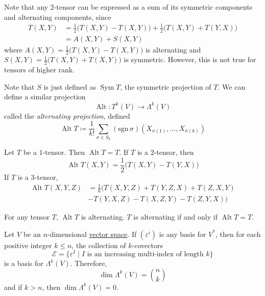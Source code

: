 \documentclass{article}
\DeclareMathOperator{\Sym}{Sym}
\DeclareMathOperator{\Alt}{Alt}
\newcounter{theorem}[section]
\newcounter{example}[section]
\begin{document}
    Note that any $2$-tensor can be expressed as a sum of its symmetric components and alternating components, since
    \begin{align*}
        T(X, Y) & = \frac{1}{2} \big( T(X, Y) - T(X, Y)\big) + \frac{1}{2} \big( T(X, Y) + T(Y, X) \big) \\
        & = A(X, Y) + S(X, Y)
    \end{align*}
    where $A(X, Y) = \frac{1}{2} \big( T(X, Y) - T(X, Y) \big)$ is alternating and $S (X, Y) = \frac{1}{2} \big( T(X, Y) + T(X, Y) \big)$ is symmetric. However, this is not true for tensors of higher rank. 

    Note that $S$ is just defined as $\Sym{T}$, the symmetric projection of $T$. We can define a similar projection 
    \begin{equation}
      \Alt: T^k (V) \to \Lambda^k (V)
    \end{equation}
    called the \textit{alternating projection}, defined
    \begin{equation}
      \Alt{T} \coloneqq \frac{1}{k!} \sum_{\sigma \in S_k} (\text{sgn}\,\sigma) (X_{\sigma(1)}, ..., X_{\sigma(k)})
    \end{equation}

    \begin{example}
      \label{ex:alternation-of-1-and-2-tensors}
    Let $T$ be a $1$-tensor. Then $\Alt{T} = T$. If $T$ is a $2$-tensor, then
    \begin{equation}
      \Alt{T(X, Y)} = \frac{1}{2} \big(T(X, Y) - T(Y, X) \big)
    \end{equation}
    If $T$ is a $3$-tensor, 
    \begin{align*}
        \Alt{T(X, Y, Z)} & = \frac{1}{6} \big( T(X, Y, Z) + T(Y, Z, X) + T(Z, X, Y) \\ & - T(Y, X, Z) - T(X, Z, Y) - T(Z, Y, X) \big)  
    \end{align*}
    \end{example}

    \begin{lemma}
      \label{thm:properties-of-the-alternating-projection}
    For any tensor $T$, $\Alt{T}$ is alternating. $T$ is alternating if and only if $\Alt{T} = T$. 
    \end{lemma}

    \begin{theorem}
      \label{thm:basis-for-the-space-of-alternating-tensors}
    Let $V$ be an $n$-dimensional \hyperref[lin-def:vector-space]{vector space}. If $(\varepsilon^i)$ is any basis for $V^*$, then for each positive integer $k \leq n$, the collection of $k$-covectors 
    \begin{equation}
      \mathcal{E} = \{\varepsilon^I \;|\; I \text{ is an increasing multi-index of length } k\}
    \end{equation}
    is a basis for $\Lambda^k (V)$. Therefore, 
      \begin{equation}
        \dim \Lambda^k (V) = \binom{n}{k}
      \end{equation}
    and if $k > n$, then $\dim{\Lambda^k (V)} = 0$. 
    \end{theorem}
\end{document}
